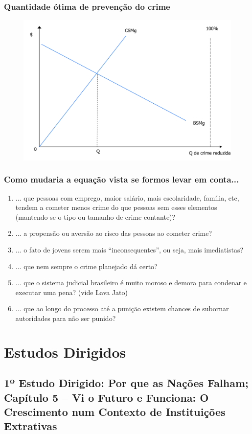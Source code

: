 \documentclass[a4paper,12pt]{article}[abntex2]
\begin{document}
\subsubsection{\textbf{Quantidade ótima de prevenção do crime}}
\begin{figure}[H]
    \centering
    \includegraphics[width=0.7\linewidth]{Imagens/a20i1.png}
\end{figure}

\subsubsection{\textbf{Como mudaria a equação vista se formos levar em conta...}}
\begin{enumerate}
    \item ... que pessoas com emprego, maior salário, mais escolaridade, família, etc, tendem a cometer menos crime do que pessoas sem esses elementos (mantendo-se o tipo ou tamanho de crime contante)?
    \item ... a propensão ou aversão ao risco das pessoas ao cometer crime? 
    \item ... o fato de jovens serem mais “inconsequentes”, ou seja, mais imediatistas?
    \item ... que nem sempre o crime planejado dá certo?
    \item ... que o sistema judicial brasileiro é muito moroso e demora para condenar e executar uma pena? (vide Lava Jato)
    \item ... que ao longo do processo até a punição existem chances de subornar autoridades para não ser punido?
\end{enumerate}


\newpage
\section{\textbf{Estudos Dirigidos}}
\subsection{\textbf{1º Estudo Dirigido: Por que as Nações Falham; Capítulo 5 – Vi o Futuro e Funciona: O Crescimento num Contexto de Instituições Extrativas}}
\end{document}
